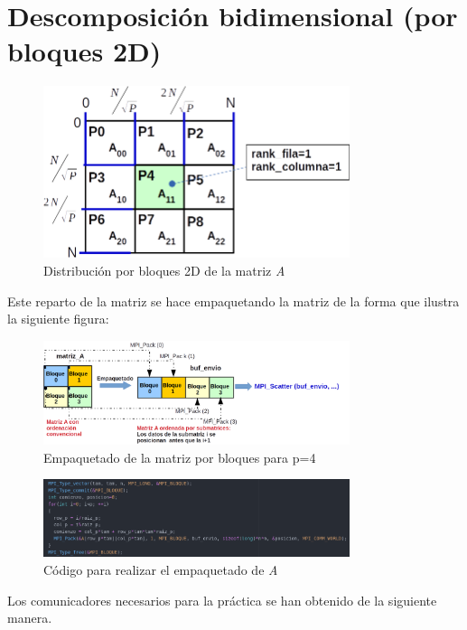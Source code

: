 \section{Descomposición bidimensional (por bloques 2D)}

\begin{figure}[H]
\centering
\includegraphics[width=0.8\textwidth]{imagenes/1.png}
\caption{Distribución por bloques 2D de la matriz \textit{A}}
\end{figure}

Este reparto de la matriz se hace empaquetando la matriz de la forma que ilustra la siguiente figura:

\begin{figure}[H]
\centering
\includegraphics[width=0.8\textwidth]{imagenes/3.png}
\caption{Empaquetado de la matriz por bloques para p=4}
\end{figure}

\begin{figure}[H]
\centering
\includegraphics[width=0.8\textwidth]{imagenes/tipo.png}
\caption{Código para realizar el empaquetado de \textit{A}}
\end{figure}

Los comunicadores necesarios para la práctica se han obtenido de la siguiente manera.

